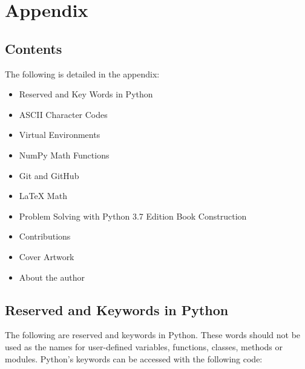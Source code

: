 \documentclass{book}
\begin{document}
    




    
        \hypertarget{appendix}{%
\chapter{Appendix}\label{appendix}}
    




    
        \hypertarget{contents}{%
\section{Contents}\label{contents}}
    




    
        The following is detailed in the appendix:

\begin{itemize}
\item
  Reserved and Key Words in Python
\item
  ASCII Character Codes
\item
  Virtual Environments
\item
  NumPy Math Functions
\item
  Git and GitHub
\item
  LaTeX Math
\item
  Problem Solving with Python 3.7 Edition Book Construction
\item
  Contributions
\item
  Cover Artwork
\item
  About the author
\end{itemize}
        \newpage

    




    
        \hypertarget{reserved-and-keywords-in-python}{%
\section{Reserved and Keywords in
Python}\label{reserved-and-keywords-in-python}}
    




    
        The following are reserved and keywords in Python. These words should
not be used as the names for user-defined variables, functions, classes,
methods or modules. Python's keywords can be accessed with the following
code:
    
\end{document}
